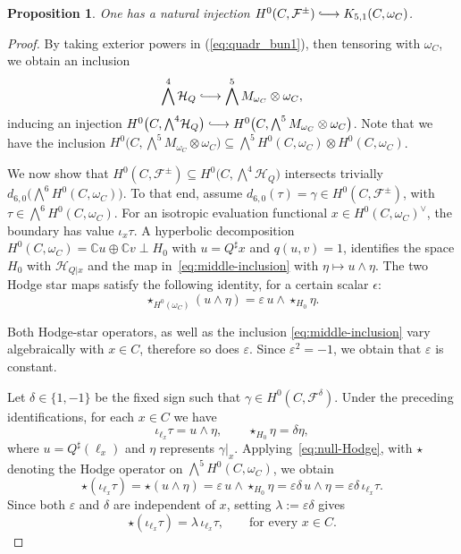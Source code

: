 \documentclass[11pt]{amsart}
\newtheorem{proposition}[theorem]{Proposition}
\theoremstyle{definition}
\def\F{\mathcal{F}}
\def\cH{\mathcal{H}}
\begin{document}
\begin{proposition}
\label{prop:star}
One has a natural injection $H^0(C,\mathcal F^\pm)\lhook\joinrel\longrightarrow K_{5,1}(C,\omega_C)$.
\end{proposition}
\begin{proof}
By taking exterior powers in (\ref{eq:quadr_bun1}), then tensoring with $\omega_C$, we obtain an inclusion
\begin{equation}\label{eq:middle-inclusion}
 \bigwedge^4\cH_Q\lhook\joinrel\longrightarrow\bigwedge^5 M_{\omega_C}\otimes \omega_C,
\end{equation}
inducing an injection $
H^0\bigl(C,\mathcal \bigwedge^4 \cH_Q\bigr)\lhook\joinrel\longrightarrow H^0\bigl(C, \bigwedge^5 M_{\omega_C}\otimes \omega_C\bigr)$.  Note that we have the inclusion $H^0\bigl(C,\bigwedge^5 M_{\omega_C}\otimes \omega_C)\subseteq \bigwedge^5 H^0(C,\omega_C)\otimes H^0(C,\omega_C)$.

\vskip 3pt

We now show that $H^0(C,\F^{\pm})\subseteq H^0\bigl(C,\bigwedge^4 \cH_Q\bigr)$ intersects trivially $d_{6,0}\bigl(\bigwedge^6H^0(C,\omega_C)\bigr)$.
To that end, assume $d_{6,0}(\tau)=\gamma\in H^0(C, \F^{\pm})$, with $\tau\in\bigwedge^6H^0(C,\omega_C)$.  For an isotropic evaluation functional $x\in H^0(C,\omega_C)^\vee$, the boundary has value $\iota_x\tau$.  A hyperbolic decomposition $H^0(C,\omega_C)=\mathbb C u\oplus\mathbb C v\perp H_0$ with $u=Q^\sharp x$ and $q(u,v)=1$, identifies the space $H_0$ with $\mathcal H_{Q|x}$ and the map in~\eqref{eq:middle-inclusion} with $\eta\mapsto u\wedge\eta$.  The two Hodge star maps satisfy the following identity, for a certain scalar $\epsilon$:
\begin{equation}\label{eq:null-Hodge}
 \star_{H^0(\omega_C)}(u\wedge\eta)=\varepsilon\,u\wedge\star_{H_0}\eta.
\end{equation}

Both Hodge-star operators, as well as the inclusion \eqref{eq:middle-inclusion} vary algebraically with $x\in C$, therefore so does $\varepsilon$. Since $\varepsilon^2=-1$, we obtain that $\varepsilon$ is constant.

 Let $\delta\in\{1,-1\}$ be the fixed sign such that
$\gamma\in H^0(C,\mathcal F^\delta)$.
Under the preceding identifications, for each $x\in C$ we have
\[
\iota_{\ell_x}\tau=u\wedge\eta,
\qquad
\star_{H_0}\eta=\delta\eta,
\]
where $u=Q^\sharp(\ell_x)$ and $\eta$ represents
$\gamma|_x$. Applying~\eqref{eq:null-Hodge}, with $\star$ denoting
the Hodge operator on
$\bigwedge^5H^0(C,\omega_C)$, we obtain
$$
\star(\iota_{\ell_x}\tau)=\star(u\wedge\eta)
=\varepsilon\,u\wedge\star_{H_0}\eta
=\varepsilon\delta\,u\wedge\eta
=\varepsilon\delta\,\iota_{\ell_x}\tau.
$$
Since both $\varepsilon$ and $\delta$ are
independent of $x$, setting
$\lambda:=\varepsilon\delta$ gives
\[
\star(\iota_{\ell_x}\tau)
=\lambda\,\iota_{\ell_x}\tau,
\qquad\text{for every }x\in C.
\]






\end{proof}
\end{document}
